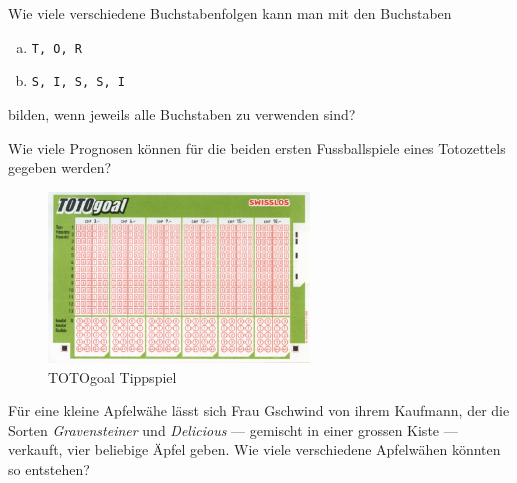 \documentclass[%
11pt,%
twoside,%
titlepage,%
german,%
headsepline%
]{scrartcl}
\begin{document}
\begin{ueb}\label{sissi}
Wie viele verschiedene Buchstabenfolgen kann man mit den Buchstaben
\begin{enumerate}[a)]
\item \texttt{T, O, R}
\item \texttt{S, I, S, S, I}
\end{enumerate}
bilden, wenn jeweils alle Buchstaben zu verwenden sind?
\end{ueb}

\begin{ueb}[TOTOGoal]
Wie viele Prognosen können für die beiden ersten Fussballspiele eines Totozettels gegeben werden?
\begin{figure}
\begin{center}
\includegraphics[width=0.618\textwidth]{pictures/TotoGoal}
\caption{TOTOgoal Tippspiel}
\end{center}
\end{figure}
\end{ueb}

\begin{ueb}[Öpfuchueche]\label{aepfel}
 Für eine kleine Apfelwähe lässt sich Frau Gschwind von ihrem Kaufmann, der die Sorten \emph{Gravensteiner} und \emph{Delicious} --- gemischt in einer grossen Kiste --- verkauft, vier beliebige Äpfel geben. Wie viele verschiedene Apfelwähen könnten so entstehen?
 \end{ueb}
 
 
  
\end{document}
